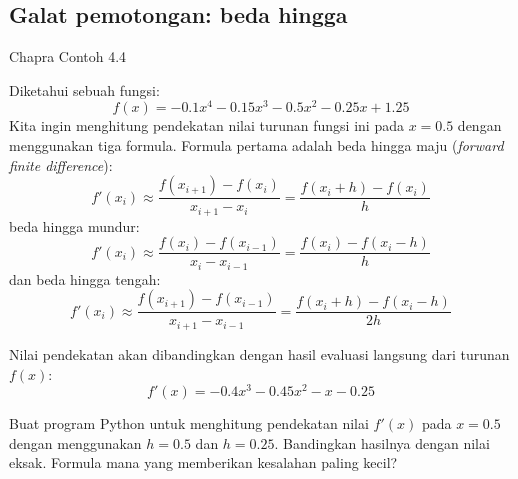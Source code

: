 \subsection{Galat pemotongan: beda hingga}

Chapra Contoh 4.4

Diketahui sebuah fungsi:
\begin{equation}
f(x) = -0.1x^4 - 0.15x^3 - 0.5x^2 - 0.25x + 1.25
\end{equation}
Kita ingin menghitung pendekatan nilai turunan fungsi ini pada $x=0.5$ dengan menggunakan tiga formula.
Formula pertama adalah beda hingga maju (\textit{forward finite difference}):
\begin{equation}
f'(x_{i}) \approx \frac{f(x_{i+1}) - f(x_{i})}{x_{i+1} - x_{i}} =
\frac{f(x_{i}+h) - f(x_{i})}{h}
\end{equation}
beda hingga mundur:
\begin{equation}
f'(x_{i}) \approx \frac{f(x_{i}) - f(x_{i-1})}{x_{i} - x_{i-1}} =
\frac{f(x_{i}) - f(x_{i}-h)}{h}
\end{equation}
dan beda hingga tengah:
\begin{equation}
f'(x_{i}) \approx \frac{f(x_{i+1}) - f(x_{i-1})}{x_{i+1} - x_{i-1}} =
\frac{f(x_{i}+h) - f(x_{i}-h)}{2h}
\end{equation}

Nilai pendekatan akan dibandingkan dengan hasil evaluasi langsung dari
turunan $f(x)$:
\begin{equation}
f'(x) = -0.4x^3 - 0.45x^2 - x - 0.25
\end{equation}

\begin{soal}
Buat program Python untuk menghitung pendekatan nilai $f'(x)$ pada $x=0.5$ dengan
menggunakan $h=0.5$ dan $h=0.25$. Bandingkan hasilnya dengan nilai eksak. Formula mana yang
memberikan kesalahan paling kecil?
\end{soal}